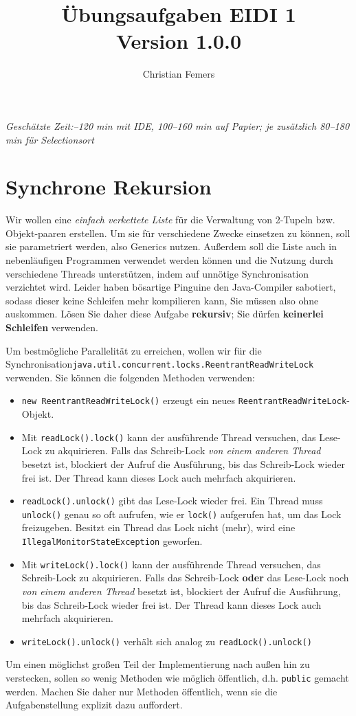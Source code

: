 \documentclass[11pt]{article} %
\title{Übungsaufgaben EIDI 1 \\ \small \color{magenta}Version 1.0.0}
\author{Christian Femers}
\begin{document}
\maketitle
\emph{Geschätzte Zeit:–120 min mit IDE, 100–160 min auf Papier; je zusätzlich 80–180 min für Selectionsort}
\section{Synchrone Rekursion}
Wir wollen eine \emph{einfach verkettete Liste} für die Verwaltung von 2-Tupeln bzw. Objekt-paaren erstellen. Um sie für verschiedene Zwecke einsetzen zu können, soll sie parametriert werden, also Generics nutzen. Außerdem soll die Liste auch in nebenläufigen Programmen verwendet werden können und die Nutzung durch verschiedene Threads unterstützen, indem auf unnötige Synchronisation verzichtet wird. Leider haben bösartige Pinguine den Java-Compiler sabotiert, sodass dieser keine Schleifen mehr kompilieren kann, Sie müssen also ohne auskommen. Lösen Sie daher diese Aufgabe \textbf{rekursiv}; Sie dürfen \textbf{keinerlei Schleifen} verwenden.\par
Um bestmögliche Parallelität zu erreichen, wollen wir für die Synchronisation\newline \texttt{java.util.concurrent.locks.ReentrantReadWriteLock} verwenden. Sie können die folgenden Methoden verwenden:
\begin{itemize}
\item \texttt{new ReentrantReadWriteLock()} erzeugt ein neues \texttt{ReentrantReadWriteLock}-Objekt.
\item Mit \texttt{readLock().lock()} kann der ausführende Thread versuchen, das Lese-Lock zu akquirieren. Falls das Schreib-Lock \emph{von einem anderen Thread} besetzt ist, blockiert der Aufruf die Ausführung, bis das Schreib-Lock wieder frei ist. Der Thread kann dieses Lock auch mehrfach akquirieren.
\item \texttt{readLock().unlock()} gibt das Lese-Lock wieder frei. Ein Thread muss \texttt{unlock()} genau so oft aufrufen, wie er \texttt{lock()} aufgerufen hat, um das Lock freizugeben. Besitzt ein Thread das Lock nicht (mehr), wird eine \texttt{IllegalMonitorStateException} geworfen.
\item Mit \texttt{writeLock().lock()} kann der ausführende Thread versuchen, das Schreib-Lock zu akquirieren. Falls das Schreib-Lock \textbf{oder} das Lese-Lock noch \emph{von einem anderen Thread} besetzt ist, blockiert der Aufruf die Ausführung, bis das Schreib-Lock wieder frei ist. Der Thread kann dieses Lock auch mehrfach akquirieren.
\item \texttt{writeLock().unlock()} verhält sich analog zu \texttt{readLock().unlock()}
\end{itemize}
Um einen möglichst großen Teil der Implementierung nach außen hin zu verstecken, sollen so wenig Methoden wie möglich öffentlich, d.h. \texttt{public} gemacht werden. Machen Sie daher nur Methoden öffentlich, wenn sie die Aufgabenstellung explizit dazu auffordert.
\end{document}
